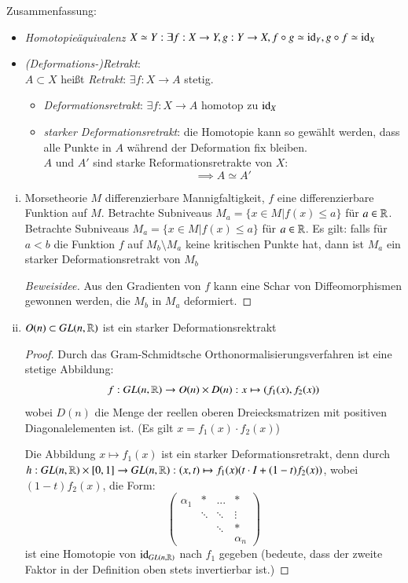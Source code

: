 \documentclass[a4paper,10pt]{scrartcl}
\begin{document}
\begin{seg}{Zusammenfassung:}
\begin{itemize}
 \item \emph{Homotopieäquivalenz} $X\simeq Y: \exists f: X\to Y, g: Y\to X, f\circ g \simeq \operatorname{id}_Y, g\circ f \simeq \operatorname{id}_X$
 \item \emph{(Deformations-)Retrakt}:\\
$A\subset X$ heißt \emph{Retrakt}: $\exists f: X\to A$ stetig.
\begin{itemize}
\item \emph{Deformationsretrakt}: $\exists f: X\to A$ homotop zu $\operatorname{id}_X$
\item \emph{starker Deformationsretrakt}: die Homotopie kann so gewählt werden, dass alle Punkte in $A$ während der Deformation fix bleiben.\\
\fixme[fig46]
$A$ und $A'$ sind starke Reformationsretrakte von $X$:
\[
 \implies A \simeq A'
\]
\end{itemize}
\end{itemize}
\end{seg}
\begin{exs*}
\begin{enumerate}[(i)]
 \item 
\begin{seg}{Morsetheorie} 
$M$ differenzierbare Mannigfaltigkeit, $f$ eine differenzierbare Funktion auf $M$. Betrachte Subniveaus $M_a=\{x\in M|f(x)\le a\}$ für $a\in \mathbb{R}$.
Betrachte Subniveaus $M_a=\{x\in M|f(x)\le a\}$ für $a\in \mathbb{R}$.
 \fixme[fig47]
Es gilt: falls für $a<b$ die Funktion $f$ auf $M_b\setminus M_a$ keine kritischen Punkte hat, dann ist $M_a$ ein starker Deformationsretrakt von $M_{b}$
\end{seg}
\begin{proof}[Beweisidee]
 Aus den Gradienten von $f$ kann eine Schar von Diffeomorphismen gewonnen werden, die $M_b$ in $M_a$ deformiert.
\end{proof}
\item $O(n)\subset GL(n, \mathbb{R})$ ist ein starker Deformationsrektrakt
\begin{proof}
 Durch das Gram-Schmidtsche Orthonormalisierungsverfahren ist eine stetige Abbildung:
\[
 f: GL(n,\mathbb{R})\to O(n)\times D(n): x\mapsto (f_1(x), f_2(x))
\]
wobei $D(n)$ die Menge der reellen oberen Dreiecksmatrizen mit positiven Diagonalelementen ist. (Es gilt $x=f_1(x)\cdot f_2(x)$)

Die Abbildung $x\mapsto f_1(x)$ ist ein starker Deformationsretrakt, denn durch $h: GL(n,\mathbb{R})\times [0,1]\to GL(n,\mathbb{R}): (x,t)\mapsto f_1(x)(t\cdot I+(1-t)f_2(x))$, wobei $(1-t)f_2(x)$, die Form:
 \[
  \begin{pmatrix}
   \alpha_1 & * & ...& *\\
 & \ddots & \ddots & \vdots\\
 & & \ddots & *\\
 & & & \alpha_n
  \end{pmatrix}
 \]
ist eine Homotopie von $\operatorname{id}_{GL(n, \mathbb{R})}$ nach $f_1$ gegeben (bedeute, dass der zweite Faktor in der Definition oben stets invertierbar ist.)
\end{proof}
\end{enumerate}
\end{exs*}
\end{document}
